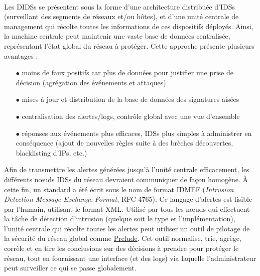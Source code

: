 \documentclass[]{article}
\newcommand{\minit}[1]{\noindent{\small\textbf{ \underline{#1}}}\vspace{0.2cm}}
\begin{document}
~\\
\minit{Les DIDSs}
\par Les DIDSs se présentent sous la forme d'une architecture distribuée d'IDSs (surveillant des segments de réseaux et/ou hôtes), et d'une unité centrale de management qui récolte toutes les informations de ces dispositifs déployés. Ainsi, la machine centrale peut maintenir une vaste base de données centralisée, représentant l'état global du réseau à protéger. Cette approche présente plusieurs 
avantages :
\vspace{0.2cm}
\begin{itemize}
\item[$\bullet$] moins de faux positifs car plus de données pour justifier une prise de décision (agrégation des événements et attaques)
\vspace{0.2cm}
\item[$\bullet$] mises à jour et distribution de la base de données des signatures aisées
\vspace{0.2cm}
\item[$\bullet$] centralisation des alertes/logs, contrôle global avec une vue d'ensemble
\vspace{0.2cm}
\item[$\bullet$] réponses aux événements plus efficaces, IDSs plus simples à administrer en conséquence (ajout de nouvelles règles suite à des brèches découvertes, blacklisting d'IPs, etc.)
\end{itemize}
\vspace{0.4cm}

\par Afin de transmettre les alertes générées jusqu'à l'unité centrale efficacement, les différents nœuds IDSs du réseau devraient communiquer de façon homogène. À cette fin, un standard a été écrit sous le nom de format IDMEF (\textit{Intrusion Detection Message Exchange Format}, RFC 4765). Ce langage d'alertes est lisible par l'humain, utilisant le format XML. Utilisé par tous les nœuds qui effectuent la tâche de détection d'intrusion (quelque soit le type et l'implémentation), l'unité centrale qui récolte toutes les alertes peut utiliser un outil de pilotage de la sécurité du réseau global comme \href{https://fr.wikipedia.org/wiki/Prelude_SIEM}{Prelude}. Cet outil normalise, trie, agrège, corrèle et en tire les conclusions sur des décisions à prendre pour protéger le réseau, tout en fournissant une interface (et des logs) via laquelle l'administrateur peut surveiller ce qui se passe globalement.
\end{document}
